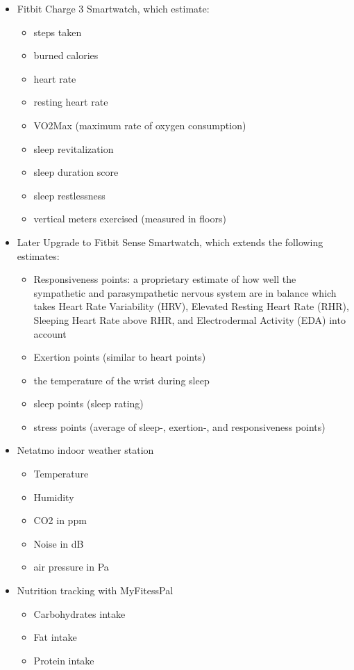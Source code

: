 \documentclass[conference]{IEEEtran}
\begin{document}
\begin{itemize}
\begin{itemize}
\end{itemize}
\item Fitbit Charge 3 Smartwatch, which estimate:
   \begin{itemize}
\item steps taken
\item burned calories
\item heart rate
\item resting heart rate
\item VO2Max (maximum rate of oxygen consumption)
\item sleep revitalization
\item sleep duration score
\item sleep restlessness
\item vertical meters exercised (measured in floors)
\end{itemize}
\item Later Upgrade to Fitbit Sense Smartwatch, which extends the following estimates:
   \begin{itemize}
\item Responsiveness points: a proprietary estimate of how well the sympathetic and parasympathetic nervous system are in balance which takes Heart Rate Variability (HRV), Elevated Resting Heart Rate (RHR), Sleeping Heart Rate above RHR, and Electrodermal Activity (EDA) into account
\item Exertion points (similar to heart points)
\item the temperature of the wrist during sleep
\item sleep points (sleep rating)
\item stress points (average of sleep-, exertion-, and responsiveness points)
\end{itemize}
\item Netatmo indoor weather station
   \begin{itemize}
\item Temperature
\item Humidity
\item CO2 in ppm
\item Noise in dB
\item air pressure in Pa
\end{itemize}
\item Nutrition tracking with MyFitessPal
   \begin{itemize}
\item Carbohydrates intake
\item Fat intake
\item Protein intake

\end{itemize}
\end{itemize}
\end{document}
